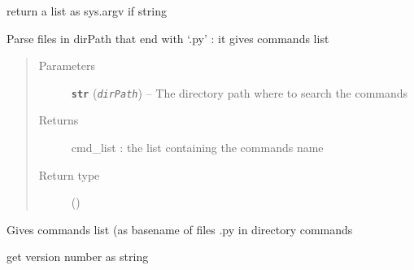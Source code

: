 \documentclass[a4paper,10pt,english]{sphinxmanual}
\begin{document}

\begin{fulllineitems}
\label{commands/apidoc/src:src.salomeTools.assumeAsList}
return a list as sys.argv if string

\end{fulllineitems}


\begin{fulllineitems}
\label{commands/apidoc/src:src.salomeTools.find_command_list}
Parse files in dirPath that end with `.py' : it gives commands list
\begin{quote}\begin{description}
\item[{Parameters}] \leavevmode
\textbf{\texttt{str}} (\emph{\texttt{dirPath}}) -- The directory path where to search the commands

\item[{Returns}] \leavevmode
cmd\_list : the list containing the commands name

\item[{Return type}] \leavevmode
{\hyperref[commands/apidoc/src:src.utilsSat.Path.list]{}} ()

\end{description}\end{quote}

\end{fulllineitems}


\begin{fulllineitems}
\label{commands/apidoc/src:src.salomeTools.getCommandsList}
Gives commands list (as basename of files .py in directory commands

\end{fulllineitems}


\begin{fulllineitems}
\label{commands/apidoc/src:src.salomeTools.getVersion}
get version number as string

\end{fulllineitems}
\end{document}
